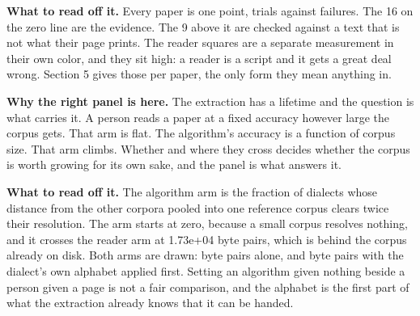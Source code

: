 \textbf{What to read off it.} Every paper is one point, trials against failures. The 16 on the zero line are the evidence. The 9 above it are checked against a text that is not what their page prints. The reader squares are a separate measurement in their own color, and they sit high: a reader is a script and it gets a great deal wrong. Section 5 gives those per paper, the only form they mean anything in.

\textbf{Why the right panel is here.} The extraction has a lifetime and the question is what carries it. A person reads a paper at a fixed accuracy however large the corpus gets. That arm is flat. The algorithm's accuracy is a function of corpus size. That arm climbs. Whether and where they cross decides whether the corpus is worth growing for its own sake, and the panel is what answers it.

\textbf{What to read off it.} The algorithm arm is the fraction of dialects whose distance from the other corpora pooled into one reference corpus clears twice their resolution. The arm starts at zero, because a small corpus resolves nothing, and it crosses the reader arm at 1.73e+04 byte pairs, which is behind the corpus already on disk. Both arms are drawn: byte pairs alone, and byte pairs with the dialect's own alphabet applied first. Setting an algorithm given nothing beside a person given a page is not a fair comparison, and the alphabet is the first part of what the extraction already knows that it can be handed.

